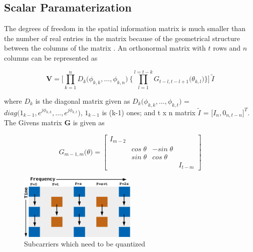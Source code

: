\documentclass[conference]{IEEEtran}
\begin{document}



\subsection{Scalar Paramaterization}
\label{givens}
The degrees of freedom in the spatial information matrix is much smaller than the number of real entries in the matrix because of the geometrical structure between the columns of the matrix \cite{4114278}. An orthonormal matrix with $t$ rows and $n$ columns can be represented as 

\begin{equation}
\textbf{V} = \Bigg[\prod_{k=1}^{n} D_{k} \big( \phi_{k,k},\ldots , \phi_{k,n} \big) \: \Bigg\{ \prod_{l=1}^{l=t-k} G_{t-l,t-l+1} \big( \theta_{k,l}\big) \Bigg\} \Bigg] \: \tilde{I} 
\end{equation}

where $D_{k}$ is the diagonal matrix given as $D_{k}\big(\phi_{k,k}, \ldots, \phi_{k,t} \big)$ =  $diag\big( 1_{k-1}, e^{j\phi_{k,k}},\ldots, e^{j\phi_{k,t}}  \big)$, $1_{k-1}$ is (k-1) ones; and t x n matrix $\tilde{I}$ = $\big[I_{n}, 0_{n,t-n}\big]^{T}$. The Givens matrix \textbf{G} is given as 

\begin{equation}
G_{m-1,m}\big(\theta\big)  = 
\begin{bmatrix}
I_{m-2} & & & \\
& cos\;\theta & - sin\;\theta & \\
& sin\;\theta & cos\;\theta & \\
& & & I_{t-m}
\end{bmatrix}
\end{equation}


\begin{figure}
\includegraphics[width=0.5\textwidth]{images/adpm.pdf}

\caption{Subcarriers which need to be quantized} 
\label{ber_overvie}
\vspace{-5pt}
\end{figure}
\end{document}
